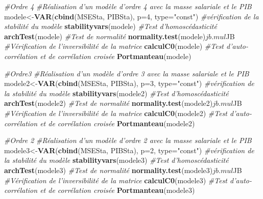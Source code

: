 \documentclass[11pt,]{article}
\newenvironment{Shaded}{\begin{snugshade}}{\end{snugshade}}
\newcommand{\KeywordTok}[1]{\textcolor[rgb]{0.13,0.29,0.53}{\textbf{{#1}}}}
\newcommand{\DataTypeTok}[1]{\textcolor[rgb]{0.13,0.29,0.53}{{#1}}}
\newcommand{\DecValTok}[1]{\textcolor[rgb]{0.00,0.00,0.81}{{#1}}}
\newcommand{\StringTok}[1]{\textcolor[rgb]{0.31,0.60,0.02}{{#1}}}
\newcommand{\CommentTok}[1]{\textcolor[rgb]{0.56,0.35,0.01}{\textit{{#1}}}}
\newcommand{\NormalTok}[1]{{#1}}
\begin{document}
\begin{Shaded}
\begin{Highlighting}[]
\CommentTok{#Ordre 4}
\CommentTok{#Réalisation d'un modèle d'ordre 4 avec la masse salariale et le PIB}
\NormalTok{modele<-}\KeywordTok{VAR}\NormalTok{(}\KeywordTok{cbind}\NormalTok{(MSESta, PIBSta), }\DataTypeTok{p=}\DecValTok{4}\NormalTok{, }\DataTypeTok{type=}\StringTok{"const"}\NormalTok{)}
\CommentTok{#vérification de la stabilité du modèle}
\KeywordTok{stabilityvars}\NormalTok{(modele)}
\CommentTok{#Test d'homoscédasticité}
\KeywordTok{archTest}\NormalTok{(modele)}
\CommentTok{#Test de normalité}
\KeywordTok{normality.test}\NormalTok{(modele)$jb.mul$JB}
\CommentTok{#Vérification de l'inversibilité de la matrice}
\KeywordTok{calculC0}\NormalTok{(modele)}
\CommentTok{#Test d'auto-corrélation et de corrélation croisée}
\KeywordTok{Portmanteau}\NormalTok{(modele)}

\CommentTok{#Ordre3}
\CommentTok{#Réalisation d'un modèle d'ordre 3 avec la masse salariale et le PIB}
\NormalTok{modele2<-}\KeywordTok{VAR}\NormalTok{(}\KeywordTok{cbind}\NormalTok{(MSESta, PIBSta), }\DataTypeTok{p=}\DecValTok{3}\NormalTok{, }\DataTypeTok{type=}\StringTok{"const"}\NormalTok{)}
\CommentTok{#vérification de la stabilité du modèle}
\KeywordTok{stabilityvars}\NormalTok{(modele2)}
\CommentTok{#Test d'homoscédasticité}
\KeywordTok{archTest}\NormalTok{(modele2)}
\CommentTok{#Test de normalité}
\KeywordTok{normality.test}\NormalTok{(modele2)$jb.mul$JB}
\CommentTok{#Vérification de l'inversibilité de la matrice}
\KeywordTok{calculC0}\NormalTok{(modele2)}
\CommentTok{#Test d'auto-corrélation et de corrélation croisée}
\KeywordTok{Portmanteau}\NormalTok{(modele2)}

\CommentTok{#Ordre 2}
\CommentTok{#Réalisation d'un modèle d'ordre 2 avec la masse salariale et le PIB}
\NormalTok{modele3<-}\KeywordTok{VAR}\NormalTok{(}\KeywordTok{cbind}\NormalTok{(MSESta, PIBSta), }\DataTypeTok{p=}\DecValTok{2}\NormalTok{, }\DataTypeTok{type=}\StringTok{"const"}\NormalTok{)}
\CommentTok{#vérification de la stabilité du modèle}
\KeywordTok{stabilityvars}\NormalTok{(modele3)}
\CommentTok{#Test d'homoscédasticité}
\KeywordTok{archTest}\NormalTok{(modele3)}
\CommentTok{#Test de normalité}
\KeywordTok{normality.test}\NormalTok{(modele3)$jb.mul$JB}
\CommentTok{#Vérification de l'inversibilité de la matrice}
\KeywordTok{calculC0}\NormalTok{(modele3)}
\CommentTok{#Test d'auto-corrélation et de corrélation croisée}
\KeywordTok{Portmanteau}\NormalTok{(modele3)}


\end{Highlighting}
\end{Shaded}
\end{document}
